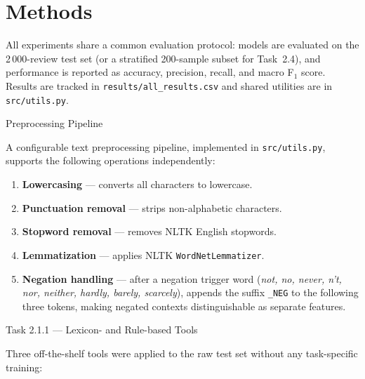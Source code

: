 \documentclass[12pt,reqno,twoside]{amsbook}
\makeatletter
\def\section{\@startsection{section}{1}%
      \z@{.5\linespacing\@plus.7\linespacing}{.25\linespacing}%
      {\normalfont\bfseries\flushleft}}
\theoremstyle{plain}
\numberwithin{equation}{chapter}
\numberwithin{section}{chapter}
\makeatother
\begin{document}
\chapter{Methods}\label{ch:methods}

\noindent All experiments share a common evaluation protocol: models are evaluated
on the 2\,000-review test set (or a stratified 200-sample subset for Task~2.4),
and performance is reported as accuracy, precision, recall, and macro
F$_1$ score.
Results are tracked in \texttt{results/all\_results.csv} and shared utilities are
in \texttt{src/utils.py}.

\section{Preprocessing Pipeline}

\noindent A configurable text preprocessing pipeline, implemented in
\texttt{src/utils.py}, supports the following operations independently:

\begin{enumerate}[noitemsep]
  \item \textbf{Lowercasing} --- converts all characters to lowercase.
  \item \textbf{Punctuation removal} --- strips non-alphabetic characters.
  \item \textbf{Stopword removal} --- removes NLTK English stopwords.
  \item \textbf{Lemmatization} --- applies NLTK \texttt{WordNetLemmatizer}.
  \item \textbf{Negation handling} --- after a negation trigger word
        (\textit{not, no, never, n't, nor, neither, hardly, barely, scarcely}),
        appends the suffix \texttt{\_NEG} to the following three tokens,
        making negated contexts distinguishable as separate features.
\end{enumerate}

\section{Task 2.1.1 --- Lexicon- and Rule-based Tools}

\noindent Three off-the-shelf tools were applied to the raw test set without
any task-specific training:
\end{document}

